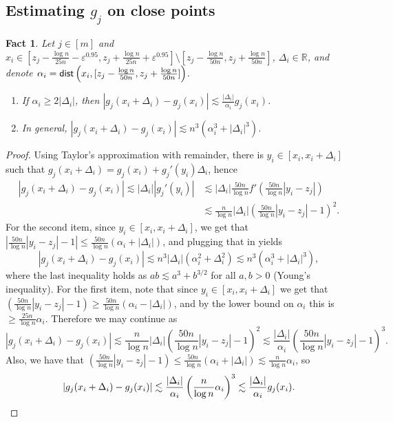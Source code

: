 \documentclass[10pt,a4paper]{article}
\newtheorem{fact}[thm]{Fact}
\newcommand\card[1]{\left| {#1} \right|}
\newcommand\eps{\varepsilon}
\renewcommand\geq{\geqslant}
\renewcommand\leq{\leqslant}
\newcommand{\De}{\Delta}
\def\ll{\lesssim}
\begin{document}
\subsection{Estimating $g_j$ on close points}
\begin{fact}\label{fact:first_order_g}
Let $j\in[m]$ and
$x_i\in [z_j - \frac{\log n}{25 n}-\eps^{0.95},z_j+\frac{\log n}{25 n}+\eps^{0.95}]\setminus [z_j - \frac{\log n}{50 n},z_j+\frac{\log n}{50 n}]$,
$\De_i\in\mathbb{R}$, and denote
$\alpha_i = {\sf dist}\left(x_i, [z_j - \frac{\log n}{50 n}, z_j+\frac{\log n}{50n}]\right)$.

\begin{enumerate}
  \item If $\alpha_i\geq 2\card{\De_i}$, then $\card{g_j(x_i+\De_i) - g_j(x_i)}\ll \frac{\card{\De_i}}{\alpha_i} g_j(x_i)$.
  \item In general, $\card{g_j(x_i+\De_i) - g_j(x_i)}\ll n^3(\alpha_i^3+\card{\De_i}^3)$.
\end{enumerate}

\end{fact}
\begin{proof}
     Using
     Taylor's approximation with remainder, there is $y_i\in [x_i,x_i + \De_i]$ such that
     $g_j(x_i+\De_i) = g_j(x_i) + g_j'(y_i)\De_i$, hence
     \begin{align*}
     \card{g_j(x_i+\De_i) - g_j(x_i)}
     \ll \card{\De_i} \card{g_j'(y_i)}
     &\ll \card{\De_i}\frac{50n}{\log n}f'\left(\frac{50n}{\log n}\card{y_i-z_j}\right)\\
     &\ll \frac{n}{\log n} \card{\De_i} \left(\frac{50n}{\log n}\card{y_i-z_j}-1\right)^2.
     \end{align*}
     For the second item, since $y_i\in [x_i,x_i+\De_i]$,
     we get that $\card{\frac{50n}{\log n}\card{y_i-z_j}-1}\leq \frac{50n}{\log n}\left(\alpha_i + \card{\De_i}\right)$,
     and plugging that in yields
     \[
     \card{g_j(x_i+\De_i) - g_j(x_i)}
     \ll n^3\card{\De_i}(\alpha_i^2 + \De_i^2)
     \ll n^3(\alpha_i^3+\card{\De_i}^3),
     \]
     where the last inequality holds as $ab\ll a^3 + b^{3/2}$ for all $a,b>0$ (Young's inequality).
     For the first item, note that since $y_i\in [x_i,x_i+\De_i]$ we get that
     $\left(\frac{50n}{\log n}\card{y_i-z_j}-1\right)\geq \frac{50n}{\log n}\left(\alpha_i - \card{\De_i}\right)$,
     and by the lower bound on $\alpha_i$ this is $\geq \frac{25n}{\log n}\alpha_i$. Therefore we may continue
     as
     \[
     \card{g_j(x_i+\De_i) - g_j(x_i)}
     \ll \frac{n}{\log n} \card{\De_i} \left(\frac{50n}{\log n}\card{y_i-z_j}-1\right)^2
     \ll \frac{\card{\De_i}}{\alpha_i}\left(\frac{50n}{\log n}\card{y_i-z_j}-1\right)^3.
     \]
     Also, we have that
     $\left(\frac{50n}{\log n}\card{y_i-z_j}-1\right)\leq \frac{50n}{\log n}\left(\alpha_i + \card{\De_i}\right)
     \ll \frac{n}{\log n} \alpha_i$, so
     \[
     \card{g_j(x_i+\De_i) - g_j(x_i)}
     \ll \frac{\card{\De_i}}{\alpha_i}\left(\frac{n}{\log n} \alpha_i\right)^3
     \ll \frac{\card{\De_i}}{\alpha_i}g_j(x_i).\qedhere
     \]

\end{proof}
\end{document}
